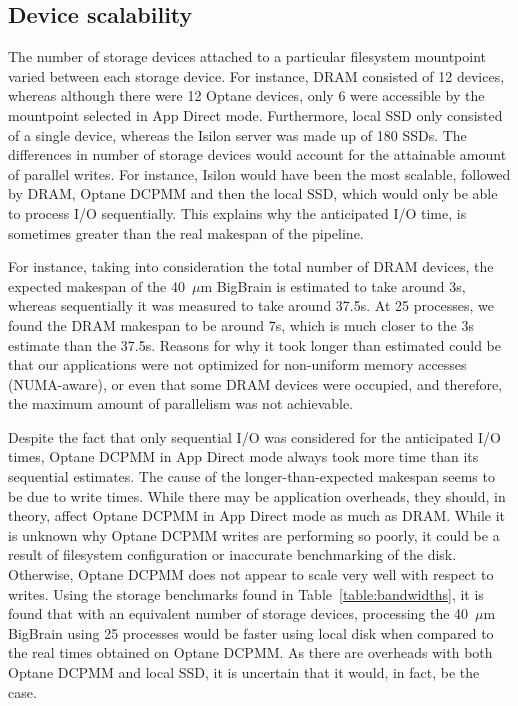 \documentclass[conference]{IEEEtran}
\newcommand{\bigbrain}{BigBrain\xspace}
\begin{document}
\subsection{Device scalability}
The number of storage devices attached to a particular filesystem mountpoint varied between
each storage device. For instance, DRAM consisted of 12 devices, whereas although there were 
12 Optane devices, only 6 were accessible by the mountpoint selected in App Direct mode. Furthermore,
local SSD only consisted of a single device, whereas the Isilon server was made up of 180 SSDs. The differences
in number of storage devices would account for the attainable amount of parallel writes. For instance, 
Isilon would have been the most scalable, followed by DRAM, Optane DCPMM and then the local SSD, which would
only be able to process I/O sequentially. This explains why the anticipated I/O time, is sometimes greater
than the real makespan of the pipeline.

For instance, taking into consideration the total number of DRAM devices, the expected makespan of the
40~$\mu$m \bigbrain is estimated to take around 3s, whereas sequentially it was measured to take
around 37.5s. At 25 processes, we found the DRAM makespan to be around 7s, which is much closer to the 3s
estimate than the 37.5s. Reasons for why it took longer than estimated could be that
our applications were not optimized for non-uniform memory accesses (NUMA-aware), or even that some DRAM devices were occupied, and therefore, the maximum amount of parallelism 
was not achievable. 

Despite the fact that only sequential I/O was considered for the anticipated I/O times, 
Optane DCPMM in App Direct mode always took more time than its sequential estimates. The cause
of the longer-than-expected makespan seems to be due to write times. While there may be application overheads,
they should, in theory, affect Optane DCPMM in App Direct mode as much as DRAM. While it is unknown
why Optane DCPMM writes are performing so poorly, it could be a result of filesystem configuration or 
inaccurate benchmarking of the disk. Otherwise, Optane DCPMM does not appear to scale very well with respect to
writes. Using the storage benchmarks found in Table~\ref{table:bandwidths}, it is found that with an equivalent
number of storage devices, processing the 40~$\mu$m \bigbrain using 25 processes would be faster using
local disk when compared to the real times obtained on Optane DCPMM. As there are overheads with both Optane DCPMM and local
SSD, it is uncertain that it would, in fact, be the case.
\end{document}
